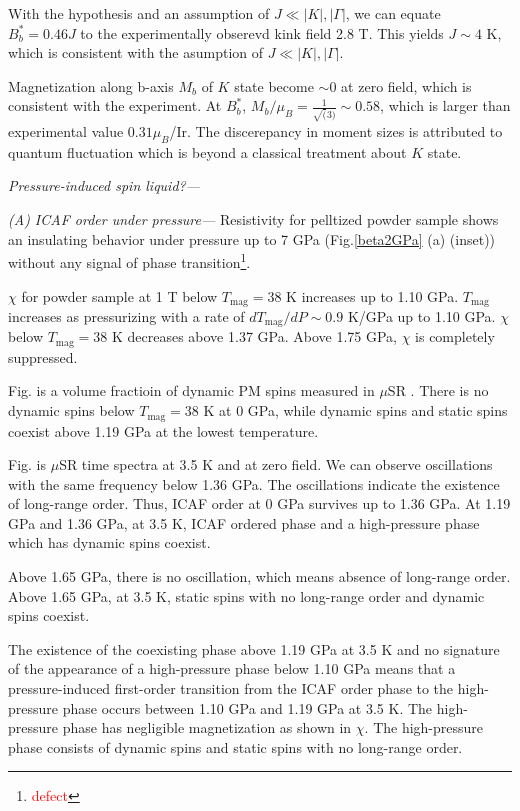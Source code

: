 With the hypothesis and an assumption of $J \ll |K|, |\Gamma|$, we can equate $B^*_b = 0.46J$ to the experimentally obserevd kink field 2.8 T.
This yields $J \sim 4$ K, which is consistent with the asumption of $J \ll |K|, |\Gamma|$.

Magnetization along b-axis $M_b$ of $K$ state become $\sim 0$ at zero field, which is consistent with the experiment.
At $B^*_b$, $M_b/\mu_B = \frac{1}{\sqrt(3)} \sim 0.58$, which is larger than experimental value $0.31 \mu_B$/Ir.
The discerepancy in moment sizes is attributed to quantum fluctuation which is beyond a classical treatment about $K$ state.

\vspace{3mm}
\noindent\textit{Pressure-induced spin liquid?---}

\noindent\textit{(A) ICAF order under pressure---} Resistivity for pelltized powder sample shows an insulating behavior under pressure up to 7 GPa (Fig.\ref{beta2GPa} (a) (inset)) without any signal of phase transition\footnote{\textcolor{red}{defect}}.

$\chi$ for powder sample at 1 T below $T_\mathrm{mag} = 38$ K increases up to 1.10 GPa.
$T_\mathrm{mag}$ increases as pressurizing with a rate of $dT_\mathrm{mag}/dP \sim 0.9$ K/GPa up to 1.10 GPa.
$\chi$ below $T_\mathrm{mag} = 38$ K decreases above 1.37 GPa.
Above 1.75 GPa, $\chi$ is completely suppressed.

Fig. is a volume fractioin of dynamic PM spins measured in $\mu$SR \cite{Majumder2018}.
There is no dynamic spins below $T_\mathrm{mag} = 38$ K at 0 GPa, while dynamic spins and static spins coexist above 1.19 GPa at the lowest temperature.

Fig. is  $\mu$SR time spectra at 3.5 K and at zero field.
We can observe oscillations with the same frequency below 1.36 GPa.
The oscillations indicate the existence of long-range order.
Thus, ICAF order at 0 GPa survives up to 1.36 GPa.
At 1.19 GPa and 1.36 GPa, at 3.5 K, ICAF ordered phase and a high-pressure phase which has dynamic spins coexist.

Above 1.65 GPa, there is no oscillation, which means absence of long-range order.
Above 1.65 GPa, at 3.5 K, static spins with no long-range order and dynamic spins coexist.

The existence of the coexisting phase above 1.19 GPa at 3.5 K and no signature of the appearance of a high-pressure phase below 1.10 GPa means that a pressure-induced first-order transition from the ICAF order phase to the high-pressure phase occurs between 1.10 GPa and 1.19 GPa at 3.5 K.
The high-pressure phase has negligible magnetization as shown in $\chi$.
The high-pressure phase consists of dynamic spins and static spins with no long-range order.

